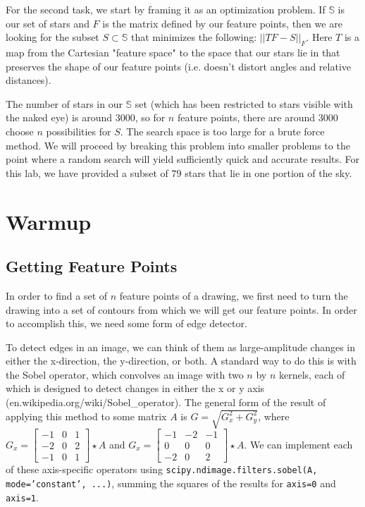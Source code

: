 \documentclass[paper=a4, fontsize=11pt]{scrartcl} %
\begin{document}
For the second task, we start by framing it as an optimization problem. If $\mathbb{S}$ is our set of stars and $F$ is the matrix defined by our feature points, then we are looking for the subset $S\subset\mathbb{S}$ that minimizes the following: $||TF - S||_F$.  Here $T$ is a map from the Cartesian "feature space" to the space that our stars lie in that preserves the shape of our feature points (i.e. doesn't distort angles and relative distances).

The number of stars in our $\mathbb{S}$ set (which has been restricted to stars visible with the naked eye) is around 3000, so for $n$ feature points, there are around 3000 choose $n$ possibilities for $S$. The search space is too large for a brute force method.  We will proceed by breaking this problem into smaller problems to the point where a random search will yield sufficiently quick and accurate results. For this lab, we have provided a subset of $79$ stars that lie in one portion of the sky.
\section{Warmup}

\subsection{Getting Feature Points}

In order to find a set of $n$ feature points of a drawing, we first need to turn the drawing into a set of contours from which we will get our feature points. In order to accomplish this, we need some form of edge detector. 

To detect edges in an image, we can think of them as large-amplitude changes in either the x-direction, the y-direction, or both. A standard way to do this is with the Sobel operator, which convolves an image with two $n$ by $n$ kernels, each of which is designed to detect changes in either the x or y axis (en.wikipedia.org/wiki/Sobel\_operator). The general form of the result of applying this method to some matrix $A$ is $G = \sqrt{G_x^2 + G_y^2}$, where $G_x = \begin{bmatrix}
-1& 0 & 1\\
-2 & 0& 2\\
-1 & 0& 1
\end{bmatrix}\star A$ and $G_x =\begin{bmatrix}
-1 & -2 & -1\\
0 & 0 & 0\\
-2 & 0 & 2
\end{bmatrix} \star A$. We can implement each of these axis-specific operators using \texttt{scipy.ndimage.filters.sobel(A, mode='constant', ...)}, summing the squares of the results for \texttt{axis=0} and \texttt{axis=1}.
\end{document}
